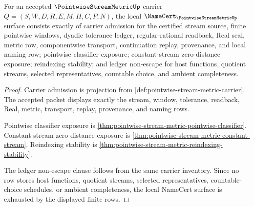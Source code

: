 \begin{theorem}
\label{thm:pointwise-stream-metric-namecert-obligations}
For an accepted $\PointwiseStreamMetricUp$ carrier $Q=(S,W,D,R,E,M,H,C,P,N)$, the local $\NameCert_{\PointwiseStreamMetricUp}$ surface consists exactly of carrier admission for the certified stream source, finite pointwise windows, dyadic tolerance ledger, regular-rational readback, Real seal, metric row, componentwise transport, continuation replay, provenance, and local naming row; pointwise classifier exposure; constant-stream zero-distance exposure; reindexing stability; and ledger non-escape for host functions, quotient streams, selected representatives, countable choice, and ambient completeness.
\end{theorem}
\begin{proof}
Carrier admission is projection from \autoref{def:pointwise-stream-metric-carrier}. The accepted packet displays exactly the stream, window, tolerance, readback, Real, metric, transport, replay, provenance, and naming rows.

Pointwise classifier exposure is \autoref{thm:pointwise-stream-metric-pointwise-classifier}. Constant-stream zero-distance exposure is \autoref{thm:pointwise-stream-metric-constant-stream}. Reindexing stability is \autoref{thm:pointwise-stream-metric-reindexing-stability}.

The ledger non-escape clause follows from the same carrier inventory. Since no row stores host functions, quotient streams, selected representatives, countable-choice schedules, or ambient completeness, the local NameCert surface is exhausted by the displayed finite rows.
\end{proof}

